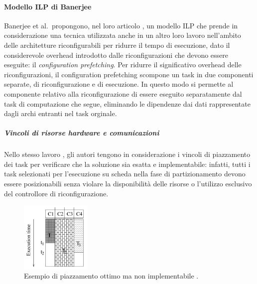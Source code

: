 \paragraph{Modello \acs{ILP} di Banerjee}
\label{par:BanerjeeILP}
Banerjee et al.~propongono, nel loro 
articolo \cite{BanerjeePhysicalConstraints}, un modello \ac{ILP} che prende in
considerazione una tecnica utilizzata anche in un altro loro lavoro 
\cite{BanerjeeReconfigurationOverhead} nell'ambito delle architetture 
riconfigurabili per ridurre il tempo di esecuzione, dato il considerevole 
over\-head introdotto dalle riconfigurazioni che devono essere eseguite: il 
\emph{configuration prefetching}. Per ridurre il significativo overhead delle 
riconfigurazioni, il configuration prefetching scompone un task in due componenti
separate, di riconfigurazione e di esecuzione. In questo modo si permette al componente 
relativo alla riconfigurazione di essere eseguito separatamente dal task di 
computazione che segue, eliminando le dipendenze dai dati rappresentate dagli 
archi entranti nel task orginale.

\subparagraph{Vincoli di risorse hardware e comunicazioni}
Nello stesso lavoro \cite{BanerjeePhysicalConstraints}, gli autori tengono 
in considerazione i vincoli di piazzamento dei task per verificare che la 
soluzione sia esatta e implementabile: infatti, tutti i task selezionati per 
l'esecuzione su scheda nella fase di partizionamento devono essere 
posizionabili senza violare la disponibilità delle risorse o l'utilizzo esclusivo del 
controllore di riconfigurazione.

\begin{figure}[!hb]
 \begin{center}
  \includegraphics[width=0.3\textwidth]
{./capitoli/figure/cap3/InfeasiblePlacement.pdf}
\caption[Piazzamento ottimo non implementabile]{Esempio di piazzamento ottimo 
  ma non implementabile \cite{BanerjeePhysicalConstraints}.}
\label{fig:infeasiblePlacement}
 \end{center}
\end{figure}


